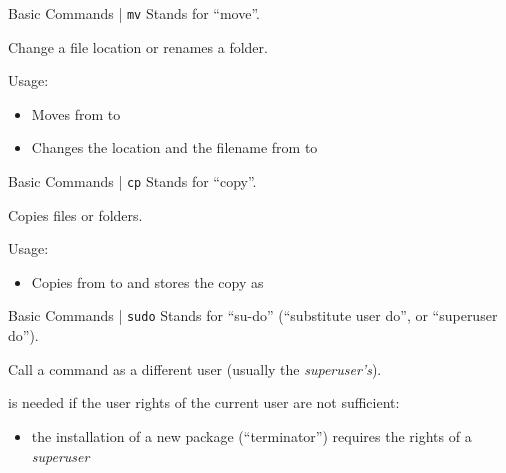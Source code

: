 \documentclass{setbeamer}
\begin{document}
\begin{frame}{Basic Commands | \texttt{mv}}
    Stands for ``move''.

    \vspace{0.3cm}

    Change a file location or renames a folder.

    \vspace{0.3cm}

    Usage:
    \begin{itemize}
        \item {}\textemdash Moves  from  to 
        \item {}\textemdash Changes the location and the filename from  to  
    \end{itemize}
\end{frame}

\begin{frame}{Basic Commands | \texttt{cp}}
    Stands for ``copy''.

    \vspace{0.3cm}

   Copies files or folders.

    \vspace{0.3cm}

    Usage:
    \begin{itemize}
        \item {}\textemdash Copies  from  to  and stores the copy as 
    \end{itemize}
\end{frame}

\begin{frame}{Basic Commands | \texttt{sudo}}
    Stands for ``su-do'' (``substitute user do'', or ``superuser do'').

    \vspace{0.3cm}

    Call a command as a different user (usually the \emph{superuser's}).

    \vspace{0.3cm}

     is needed if the user rights of the current user are not sufficient:
    \begin{itemize}
        \item {}\textemdash the installation of a new package (``terminator'') requires the rights of a \emph{superuser}
    \end{itemize}
\end{frame}
\end{document}
